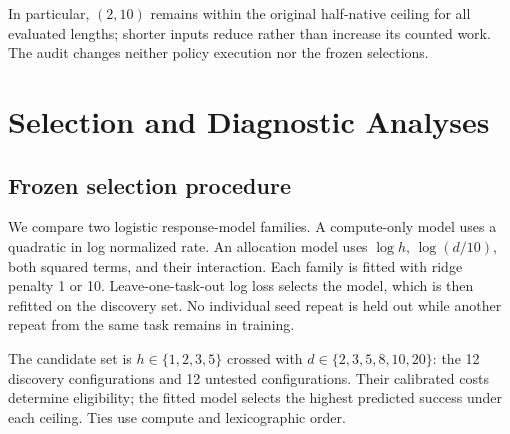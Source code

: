 \documentclass{article}
\begin{document}
In particular, $(2,10)$ remains within the original half-native ceiling for all
evaluated lengths; shorter inputs reduce rather than increase its counted work.
The audit changes neither policy execution nor the frozen selections.

\FloatBarrier
\section{Selection and Diagnostic Analyses}
\label{app:selectors}

\subsection{Frozen selection procedure}

We compare two logistic response-model families. A compute-only model uses a
quadratic in log normalized rate. An allocation model uses $\log h$,
$\log(d/10)$, both squared terms, and their interaction. Each family is fitted
with ridge penalty 1 or 10. Leave-one-task-out log loss selects the model, which
is then refitted on the discovery set. No individual seed repeat is held out
while another repeat from the same task remains in training.

The candidate set is $h\in\{1,2,3,5\}$ crossed with $d\in\{2,3,5,8,10,20\}$:
the 12 discovery configurations and 12 untested configurations. Their calibrated costs determine
eligibility; the fitted model selects the highest predicted success under each
ceiling. Ties use compute and lexicographic order.

\begin{table}[htbp]
\centering\small
\caption{Discovery-based selector choices.
The learned choices and comparisons were fixed before held-out evaluation; additional
selector baselines were documented after collection began.
The empirical selector uses the measured grid; other selectors use the declared
candidate set. The simple rule exactly matches the learned choices. The selected
rate ratio is the learned recommendation's nominal arithmetic rate
divided by the native rate. Prespecified comparators
and predicted gaps appear in Table~\ref{tab:confirmation-predictions};
the half-native row is primary.
}
\label{tab:selectors}

\end{table}

\begin{table}[htbp]
\centering\small
\caption{All prespecified denoising comparisons: selected minus comparator,
holding $h$ fixed within each row. Predicted and observed gaps and intervals are
percentage points. The half-native row is primary; secondary intervals are
descriptive, task-conditional, and unadjusted.}
\label{tab:confirmation-predictions}

\end{table}
\end{document}
